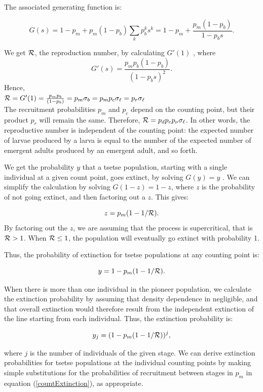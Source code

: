 \documentclass[smallextended]{svjour3}
\begin{document}
The associated generating function  is:

$$G(s) = 1-p_m + p_m (1-p_b) \sum_k p_b^k s^k = 1-p_m + \frac{p_m (1-p_b)}{1-p_b s}.$$

We get ${\cal R}$, the reproduction number, by calculating $G'(1)$ \cite{bartlett1949some}, where $$G'(s) = \frac{p_m p_b (1-p_b)}{(1-p_b s)^2}.$$  Hence, \\

$ {\cal R}= G'(1) = \frac{p_m p_b}{(1-p_b)} = p_m \sigma_b = p_mp_c \sigma_\ell =  p_r\sigma_\ell$ \\

The recruitment probabilities $p_m$ and $p_c$ depend on the counting point, but their product $p_r$ will remain the same. Therefore, ${\cal R} =p_dp_ep_{\nu} \sigma_{\ell}$. In other words, the reproductive number is independent of the counting point: the expected number of larvae produced by a larva is equal to the number of the expected number of emergent adults produced by an emergent adult, and so forth.

We get the probability $y$ that a tsetse population, starting with a single individual at a given count point, goes extinct, by solving $G(y) = y$ \cite{bartlett1949some}. We can simplify the calculation by solving   $G(1-z) = 1-z$, where $z$ is the probability of not going extinct, and then factoring out a $z$. This gives:

$$ z = p_m(1-1/{\cal R}).$$  
By factoring out the $z$, we are assuming that the process is supercritical, that is ${\cal R} > 1$. When ${\cal R} \leq 1$, the population will eventually go extinct with probability 1. 

Thus, the probability of extinction for tsetse populations at any counting point is:

\begin{equation}
	\label{countExtinction}	
	y = 1 - p_m(1-1/{\cal R}).	
\end{equation}

When there is more than one individual in the pioneer population, we calculate the extinction probability by assuming that density dependence in negligible, and that overall extinction would therefore result from the independent extinction of the line starting from each individual. Thus, the extinction probability is:

$$y_j = (1 - p_m(1-1/{\cal R}))^j,$$

where $j$ is the number of individuals of the given stage. We can derive extinction probabilities for tsetse populations at the individual counting points by making simple substitutions for the probabilities of recruitment  between stages in $p_m$  in equation (\ref{countExtinction}), as appropriate. 
\end{document}
